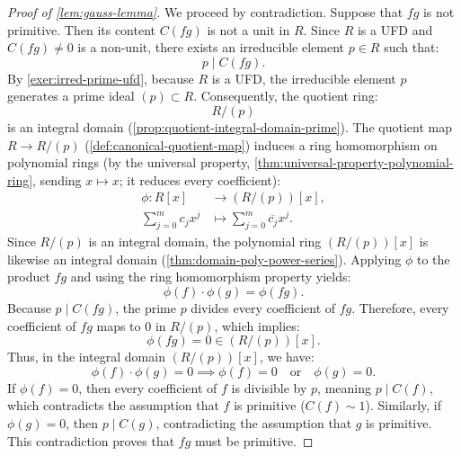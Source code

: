 \begin{content}
\begin{proof}[Proof of \cref{lem:gauss-lemma}]
We proceed by contradiction. Suppose that $fg$ is not primitive. Then its content $C(fg)$ is not a unit in $R$.
Since $R$ is a UFD and $C(fg) \neq 0$ is a non-unit, there exists an irreducible element $p \in R$ such that:
\[
p \mid C(fg).
\]
By \cref{exer:irred-prime-ufd}, because $R$ is a UFD, the irreducible element $p$ generates a prime ideal $(p) \subset R$. Consequently, the quotient ring:
\[
R / (p)
\]
is an integral domain (\cref{prop:quotient-integral-domain-prime}).
The quotient map $R \to R / (p)$ (\cref{def:canonical-quotient-map}) induces a ring homomorphism on polynomial rings (by the universal property, \cref{thm:universal-property-polynomial-ring}, sending $x \mapsto x$; it reduces every coefficient):
\begin{align*}
\phi \colon R[x] &\to (R/(p))[x], \\
\sum_{j=0}^m c_j x^j &\mapsto \sum_{j=0}^m \overline{c_j} x^j.
\end{align*}
Since $R/(p)$ is an integral domain, the polynomial ring $(R/(p))[x]$ is likewise an integral domain (\cref{thm:domain-poly-power-series}).
Applying $\phi$ to the product $fg$ and using the ring homomorphism property yields:
\[
\phi(f) \cdot \phi(g) = \phi(fg).
\]
Because $p \mid C(fg)$, the prime $p$ divides every coefficient of $fg$. Therefore, every coefficient of $fg$ maps to $0$ in $R/(p)$, which implies:
\[
\phi(fg) = 0 \in (R/(p))[x].
\]
Thus, in the integral domain $(R/(p))[x]$, we have:
\[
\phi(f) \cdot \phi(g) = 0 \implies \phi(f) = 0 \quad \text{or} \quad \phi(g) = 0.
\]
If $\phi(f) = 0$, then every coefficient of $f$ is divisible by $p$, meaning $p \mid C(f)$, which contradicts the assumption that $f$ is primitive ($C(f) \sim 1$). Similarly, if $\phi(g) = 0$, then $p \mid C(g)$, contradicting the assumption that $g$ is primitive.
This contradiction proves that $fg$ must be primitive.
\end{proof}
\end{content}

\begin{hidden}
\end{hidden}

